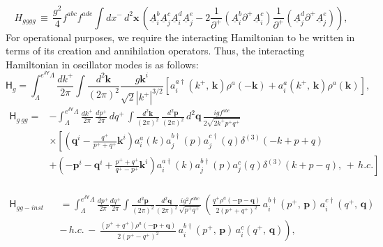 \documentclass[aps,prd,amsmath,amssymb,nofootinbib]{revtex4-2}
\numberwithin{equation}{section}
\begin{document}
 \begin{equation}H_{gggg}\,\equiv\,\frac{g^{2}}{4}f^{abc}f^{ade}\int dx^{-}\, d^{2}\mathbf{x}\,\left(\underline{A}_{i}^{b}\underline{A}_{j}^{c}\underline{A}_{i}^{d}\underline{A}_{j}^{e}-2\frac{1}{\partial^{+}}(\underline{A}_{i}^{b}\partial^{+}\underline{A}_{i}^{c})\frac{1}{\partial^{+}}(\underline{A}_{j}^{d}\partial^{+}\underline{A}_{j}^{e})\right),
 \end{equation}
For operational purposes, we require the interacting Hamiltonian to be written in terms of its creation and annihilation operators. Thus, the interacting Hamiltonian in oscillator modes is as follows:
 \begin{equation}\label{eikohg}
\mathsf{H}_{g}=\int_{\Lambda}^{e^{\delta\mathsf{Y}}\Lambda}\frac{dk^{+}}{2\pi}\int\frac{d^{2}\mathbf{k}}{(2\pi)^{2}}\frac{g\mathbf{k}^{i}}{\sqrt{2}|k^{+}|^{3/2}}\left[a_{i}^{a\dagger}(k^{+},\, \mathbf{k})\rho^{a}(-\mathbf{k})+a_{i}^{a}(k^{+},\, \mathbf{k})\rho^{a}(\mathbf{k})\right],
 \end{equation}
 \begin{equation}\begin{split}
\mathsf{H}_{g\: gg}=&-\int_{\Lambda}^{e^{\delta\mathsf{Y}}\Lambda}\frac{dk^{+}}{2\pi}\,\frac{dp^{+}}{2\pi}\, dq^{+}\,\int\frac{d^{2}\mathbf{k}}{(2\pi)^{2}}\,\frac{d^{2}\mathbf{p}}{(2\pi)^{2}}\, d^{2}\mathbf{q}\,\frac{igf^{abc}}{2\sqrt{2k^{+}p^{+}q^{+}}}\\
&\times\left[\left(\mathbf{q}^{i}-\frac{q^{+}}{p^{+}+q^{+}}\mathbf{k}^{i}\right)a_{i}^{a}(k)a_{j}^{b\dagger}(p)a_{j}^{c\dagger}(q)\delta^{(3)}(-k+p+q)\right.\\
&+\left.\left(-\mathbf{p}^{i}-\mathbf{q}^{i}+\frac{p^{+}+q^{+}}{q^{+}-p^{+}}\mathbf{k}^{i}\right)a_{i}^{a\dagger}(k)a_{j}^{b\dagger}(p)a_{j}^{c}(q)\delta^{(3)}(k+p-q),\,+\,h.c.\right]\\
 \end{split}\end{equation}

    \begin{eqnarray}
\mathsf{H}_{gg-inst}&&=\int_{\Lambda}^{e^{\delta\mathsf{Y}}\Lambda}\frac{dp^{+}}{2\pi}\frac{dq^{+}}{2\pi}\int\frac{d^{2}\mathbf{p}}{(2\pi)^{2}}\frac{d^{2}\mathbf{q}}{(2\pi)^{2}}\frac{ig^{2}f^{abc}}{\sqrt{p^{+}q^{+}}}\,\left(\frac{q^{+}\rho^{a}(-\mathbf{p}-\mathbf{q})}{2(p^{+}+q^{+})^{2}}\, a_{i}^{b\dagger}(p^{+},\,\mathbf{p})\, a_{i}^{c\dagger}(q^{+},\,\mathbf{q})\right.\nonumber\\
&&\left.-\, h.c.\,-\,\frac{(p^{+}+q^{+})\rho^{a}(-\mathbf{p}+\mathbf{q})}{2(p^{+}-q^{+})^{2}}\, a_{i}^{b\dagger}(p^{+},\,\mathbf{p})\, a_{i}^{c}(q^{+},\,\mathbf{q})\right),\end{eqnarray}
\end{document}

